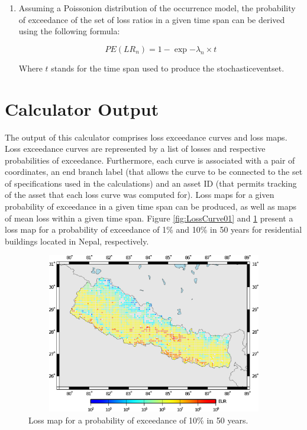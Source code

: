 \begin{enumerate}
The following formula is employed to compute the rate of exceedance:

\begin{equation}
\lambda(LR_n) = \frac{NE_{LR}}{TSES}
\end{equation}

Where  $\lambda$ stands for the rate of exceedance of the respective loss ratio, $NE_{LR}$ stands for the number of exceedances of the loss ratio, and $TSES$ stands for the time span of all \glspl{stochasticeventset}, i.e. the number of \glspl{stochasticeventset} multiplied by the time span of each.

\item Assuming a Poissonion distribution of the occurrence model, the probability of exceedance of the set of loss ratios in a given time span can be derived using the following formula:

\begin{equation}
PE(LR_n) = 1-\exp{-\lambda_n\times t}
\end{equation}

Where $t$ stands for the time span used to produce the \gls{stochasticeventset}.

\end{enumerate}
\color{black}

\section{Calculator Output}
The output of this calculator comprises loss exceedance curves and loss maps. Loss exceedance curves are represented by a list of losses and respective probabilities of exceedance. Furthermore, each curve is associated with a pair of coordinates, an end branch label (that allows the curve to be connected to the set of specifications used in the calculations) and an asset ID (that permits tracking of the asset that each loss curve was computed for). Loss maps for a given probability of exceedance in a given time span can be produced, as well as maps of mean loss within a given time span. Figure \ref{fig:LossCurve01} and \ref{fig:LossCurve001} present a loss map for a probability of exceedance of 1\% and 10\% in 50 years for residential buildings located in Nepal, respectively. 

\begin{figure}[ht]
\centering
\includegraphics[width=12cm,height=7cm]{./figures/risk/LossMap01.eps} 
\caption{Loss map for a probability of exceedance of 10\% in 50 years.}
\label{fig:LossCurve001}
\end{figure} 

